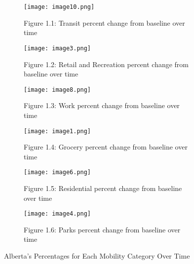\documentclass[fontsize=11pt]{article}
\begin{document}
    \begin{figure}[h]

        \begin{subfigure}{0.33\textwidth}
            \centering
            \texttt{[image: image10.png]}
            \caption{Figure 1.1: Transit percent change from baseline over time}
            \label{fig:subim1}
        \end{subfigure}
        \begin{subfigure}{0.33\textwidth}
            \centering
            \texttt{[image: image3.png]}
            \caption{Figure 1.2: Retail and Recreation percent change from baseline over time}
            \label{fig:subim2}
        \end{subfigure}
        \begin{subfigure}{0.33\textwidth}
            \centering
            \texttt{[image: image8.png]}
            \caption{Figure 1.3: Work percent change from baseline over time}
            \label{fig:subim2}
        \end{subfigure}

        \begin{subfigure}{0.33\textwidth}
            \centering
            \texttt{[image: image1.png]}
            \caption{Figure 1.4: Grocery percent change from baseline over time}
            \label{fig:subim2}
        \end{subfigure}
        \begin{subfigure}{0.33\textwidth}
            \texttt{[image: image6.png]}
            \caption{Figure 1.5: Residential percent change from baseline over time}
            \label{fig:subim2}
        \end{subfigure}
        \begin{subfigure}{0.33\textwidth}
            \texttt{[image: image4.png]}
            \caption{Figure 1.6: Parks percent change from baseline over time}
            \label{fig:subim2}
        \end{subfigure}

        \caption{Alberta’s Percentages for Each Mobility Category Over Time}
        \label{fig:image2}
    \end{figure}
\end{document}
